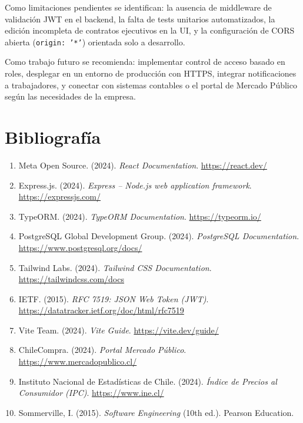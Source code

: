\documentclass[12pt,a4paper]{report}
\begin{document}
Como limitaciones pendientes se identifican: la ausencia de middleware de validación JWT en el backend, la falta de tests unitarios automatizados, la edición incompleta de contratos ejecutivos en la UI, y la configuración de CORS abierta (\texttt{origin: '*'}) orientada solo a desarrollo.

Como trabajo futuro se recomienda: implementar control de acceso basado en roles, desplegar en un entorno de producción con HTTPS, integrar notificaciones a trabajadores, y conectar con sistemas contables o el portal de Mercado Público según las necesidades de la empresa.

\clearpage
\chapter{Bibliografía}

\begin{enumerate}
  \item Meta Open Source. (2024). \textit{React Documentation}. \url{https://react.dev/}
  \item Express.js. (2024). \textit{Express -- Node.js web application framework}. \url{https://expressjs.com/}
  \item TypeORM. (2024). \textit{TypeORM Documentation}. \url{https://typeorm.io/}
  \item PostgreSQL Global Development Group. (2024). \textit{PostgreSQL Documentation}. \url{https://www.postgresql.org/docs/}
  \item Tailwind Labs. (2024). \textit{Tailwind CSS Documentation}. \url{https://tailwindcss.com/docs}
  \item IETF. (2015). \textit{RFC 7519: JSON Web Token (JWT)}. \url{https://datatracker.ietf.org/doc/html/rfc7519}
  \item Vite Team. (2024). \textit{Vite Guide}. \url{https://vite.dev/guide/}
  \item ChileCompra. (2024). \textit{Portal Mercado Público}. \url{https://www.mercadopublico.cl/}
  \item Instituto Nacional de Estadísticas de Chile. (2024). \textit{Índice de Precios al Consumidor (IPC)}. \url{https://www.ine.cl/}
  \item Sommerville, I. (2015). \textit{Software Engineering} (10th ed.). Pearson Education.
\end{enumerate}
\end{document}

